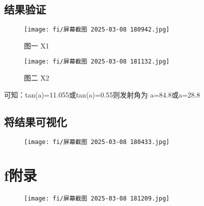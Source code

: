 \documentclass{article}
\begin{document}
\subsection{结果验证} 

\begin{figure}[h]%
	\centering
	\begin{minipage}{0.48\textwidth}
		\centering
		\texttt{[image: fi/屏幕截图 2025-03-08 180942.jpg]}
		\caption{\fontsize{10pt}{15pt}\selectfont 图一 X1}
	\end{minipage}
	\hspace{0cm}%
	\hfill%
	\begin{minipage}{0.48\textwidth}
		\centering
		\texttt{[image: fi/屏幕截图 2025-03-08 181132.jpg]}
		\caption{\fontsize{10pt}{15pt}\selectfont 图二 X2}
	\end{minipage}
\end{figure}
 可知：tan(a)=11.055或tan(a)=0.55则发射角为 a=84.8\textdegree 或a=28.8\textdegree
\\
\subsection{将结果可视化}
\begin{figure}[h]
    \centering
    \texttt{[image: fi/屏幕截图 2025-03-08 180433.jpg]}
\end{figure}


\section{f附录}
\begin{figure}[h]
    \centering
    \texttt{[image: fi/屏幕截图 2025-03-08 181209.jpg]}
\end{figure}
\end{document}
